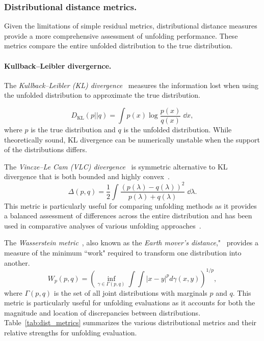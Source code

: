         \subsubsection{Distributional distance metrics.}
        \label{subsubsec:distributional-distance-metrics}
            Given the limitations of simple residual metrics, distributional distance measures provide a more comprehensive assessment of unfolding performance.
            These metrics compare the entire unfolded distribution to the true distribution.
            
            \paragraph{Kullback--Leibler divergernce.}
            The \emph{Kullback--Leibler (KL) divergence}~\cite{kullback_information_1951} measures the information lost when using the unfolded distribution to approximate the true distribution.
            
            \begin{equation}
            D_{\text{KL}}(p||q) = \int p(x) \log \frac{p(x)}{q(x)} \;\dd x,
            \end{equation}
            where \(p\) is the true distribution and
            \(q\) is the unfolded distribution.
            While theoretically sound, KL divergence can be numerically unstable when the support of the distributions differs.
            
            The \emph{Vincze--Le Cam (VLC) divergence}~\cite{vincze_concept_1981,Cam1986AsymptoticTheory} is symmetric alternative to KL divergence that is both bounded and highly convex~\cite{melbourne_strongly_2020}.
            \begin{equation}
                \Delta(p, q) = \frac{1}{2}\int \frac{(p(\lambda) - q(\lambda))^2}{p(\lambda) + q(\lambda)} \;\dd\lambda.
            \end{equation}
            This metric is particularly useful for comparing unfolding methods as it provides a balanced assessment of differences across the entire distribution and has been used in comparative analyses of various unfolding approaches~\cite{andreassen_omnifold_2020, komiske_preserving_2021}.

            The \emph{Wasserstein metric}~\cite{L.N.VasersteinIssue3Pagesnobr6472/nobr}, also known as the \emph{Earth mover's distance},"~\cite{rubner_metric_1998} provides a measure of the minimum ``work" required to transform one distribution into another.
        \begin{equation}
            W_p(p, q) = \left(\inf_{\gamma \in \Gamma(p, q)} \int\int |x-y|^p d\gamma(x, y)\right)^{1/p},
        \end{equation}
        where \(\Gamma(p, q)\) is the set of all joint distributions with marginals \(p\) and \(q\).
        This metric is particularly useful for unfolding evaluations as it accounts for both the magnitude and location of discrepancies between distributions.
        Table~\ref{tab:dist_metrics} summarizes the various distributional metrics and their relative strengths for unfolding evaluation.
        
